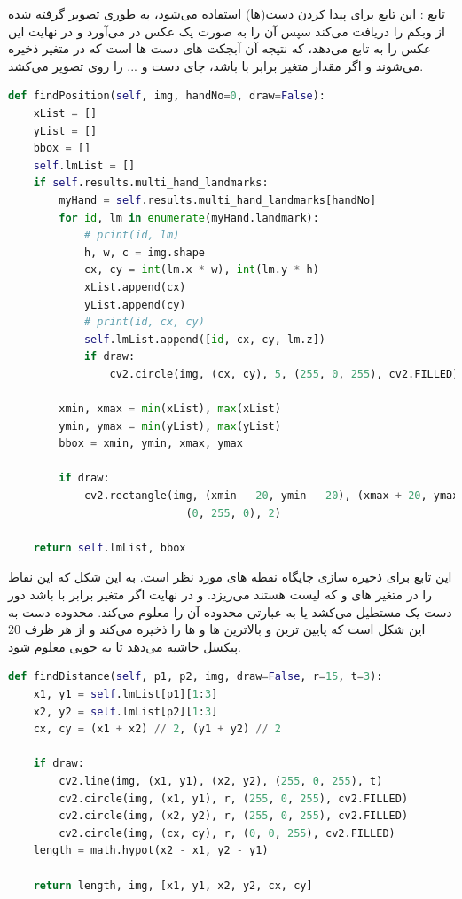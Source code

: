 \documentclass{article}
\begin{document}
تابع :
این تابع برای پیدا کردن دست(ها) استفاده می‌شود، به طوری تصویر گرفته شده از وبکم را دریافت می‌کند سپس آن را به صورت یک عکس  در می‌آورد و در نهایت این عکس را به تابع  می‌دهد، که نتیجه آن آبجکت های دست ها است که در متغیر  ذخیره می‌شوند و اگر مقدار متغیر  برابر با  باشد، جای دست و ... را روی تصویر می‌کشد.

\begin{latin}
\begin{lstlisting}[language=python]
def findPosition(self, img, handNo=0, draw=False):
    xList = []
    yList = []
    bbox = []
    self.lmList = []
    if self.results.multi_hand_landmarks:
        myHand = self.results.multi_hand_landmarks[handNo]
        for id, lm in enumerate(myHand.landmark):
            # print(id, lm)
            h, w, c = img.shape
            cx, cy = int(lm.x * w), int(lm.y * h)
            xList.append(cx)
            yList.append(cy)
            # print(id, cx, cy)
            self.lmList.append([id, cx, cy, lm.z])
            if draw:
                cv2.circle(img, (cx, cy), 5, (255, 0, 255), cv2.FILLED)

        xmin, xmax = min(xList), max(xList)
        ymin, ymax = min(yList), max(yList)
        bbox = xmin, ymin, xmax, ymax

        if draw:
            cv2.rectangle(img, (xmin - 20, ymin - 20), (xmax + 20, ymax + 20),
                            (0, 255, 0), 2)

    return self.lmList, bbox
\end{lstlisting}
\end{latin}

این تابع برای ذخیره سازی جایگاه نقطه های مورد نظر است. به این شکل که این نقاط را در متغیر های  و  که لیست هستند می‌ریزد. و در نهایت اگر متغیر  برابر با  باشد دور دست یک مستطیل می‌کشد یا به عبارتی محدوده آن را معلوم می‌کند. محدوده دست به این شکل است که پایین ترین و بالاترین  ها و  ها را ذخیره می‌کند و از هر ظرف 20 پیکسل حاشیه می‌دهد تا به خوبی معلوم شود.

\begin{latin}
\begin{lstlisting}[language=python]
def findDistance(self, p1, p2, img, draw=False, r=15, t=3):
    x1, y1 = self.lmList[p1][1:3]
    x2, y2 = self.lmList[p2][1:3]
    cx, cy = (x1 + x2) // 2, (y1 + y2) // 2

    if draw:
        cv2.line(img, (x1, y1), (x2, y2), (255, 0, 255), t)
        cv2.circle(img, (x1, y1), r, (255, 0, 255), cv2.FILLED)
        cv2.circle(img, (x2, y2), r, (255, 0, 255), cv2.FILLED)
        cv2.circle(img, (cx, cy), r, (0, 0, 255), cv2.FILLED)
    length = math.hypot(x2 - x1, y2 - y1)

    return length, img, [x1, y1, x2, y2, cx, cy]
\end{lstlisting}
\end{latin}
\end{document}
